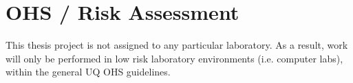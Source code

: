 \section{OHS / Risk Assessment}

This thesis project is not assigned to any particular laboratory. As a result, work will only be performed in low risk laboratory environments (i.e. computer labs), within the general UQ OHS guidelines.